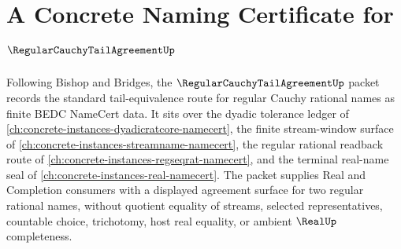 \chapter{A Concrete Naming Certificate for $\RegularCauchyTailAgreementUp$}
\label{ch:concrete-instances-regular-cauchy-tail-agreement-namecert}

Following Bishop and Bridges, the $\RegularCauchyTailAgreementUp$ packet records the standard tail-equivalence route for regular Cauchy rational names as finite BEDC NameCert data. It sits over the dyadic tolerance ledger of \autoref{ch:concrete-instances-dyadicratcore-namecert}, the finite stream-window surface of \autoref{ch:concrete-instances-streamname-namecert}, the regular rational readback route of \autoref{ch:concrete-instances-regseqrat-namecert}, and the terminal real-name seal of \autoref{ch:concrete-instances-real-namecert}. The packet supplies Real and Completion consumers with a displayed agreement surface for two regular rational names, without quotient equality of streams, selected representatives, countable choice, trichotomy, host real equality, or ambient $\RealUp$ completeness.


